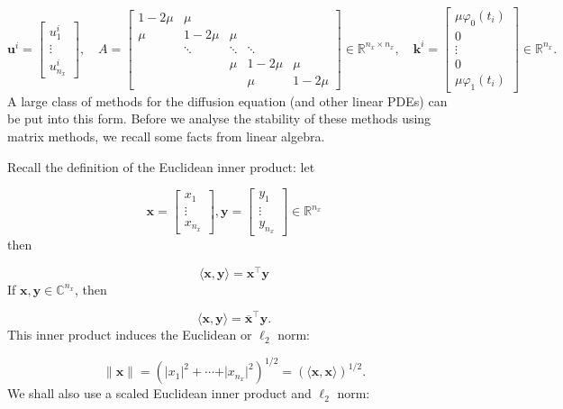 \documentclass[12pt,a4paper]{article}
\begin{document}
\[
\mathbf{u}^i = \begin{bmatrix}
u^{i}_{1} \\
\vdots \\
u^{i}_{n_x}
\end{bmatrix}, \quad A = \begin{bmatrix}
1 - 2\mu & \mu & & & \\
\mu  & 1-2\mu & \mu  & & \\
      & \ddots & \ddots & \ddots & \\
      &        & \mu    & 1- 2\mu & \mu \\
      &        &        &\mu      & 1-2\mu
\end{bmatrix} \in \mathbb{R}^{n_x \times n_x}, \quad \mathbf{k}^i=
\begin{bmatrix}
\mu\varphi_0(t_i) \\
0 \\
\vdots \\
0 \\
\mu \varphi_1(t_i)
\end{bmatrix} \in \mathbb{R}^{n_x}.
\]
A large class of methods for the diffusion equation (and other linear PDEs) can be put into this form.  Before we analyse the stability of these methods using matrix methods, we recall some facts from linear algebra.

Recall the definition of the Euclidean inner product: let

\[
\mathbf{x} = \begin{bmatrix}
x_1 \\
\vdots \\
x_{n_x}
\end{bmatrix},  \mathbf{y} = \begin{bmatrix}
y_1 \\
\vdots \\
y_{n_x}
\end{bmatrix}  \in \mathbb{R}^{n_x}
\]
then

\[
\langle \mathbf{x}, \mathbf{y}\rangle = \mathbf{x}^{\top}\mathbf{y}
\]
If $\mathbf{x}, \mathbf{y} \in \mathbb{C}^{n_x}$, then

\[
\langle \mathbf{x}, \mathbf{y}\rangle = \overline{\mathbf{x}}^{\top}\mathbf{y}.
\]
This inner product induces the Euclidean or $\ell_2$ norm:

\[
\| \mathbf{x} \| = \left(\vert x_1\vert^2 + \cdots + \vert x_{n_x}\vert^2  \right)^{1/2}  = \left(\langle\mathbf{x},\mathbf{x}\rangle\right)^{1/2}.
\]
We shall also use a scaled Euclidean inner product and $\ell_2$ norm:
\end{document}
